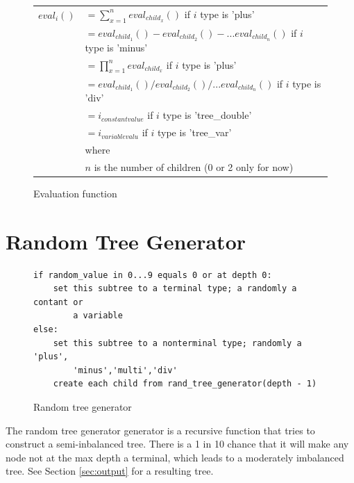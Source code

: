 \documentclass[12pt]{article}
\begin{document}
\begin{figure}[!h]
        \begin{center}
		\begin{tabular}{r l}
			$ eval_i() $	&	$ = \sum_{x=1}^{n} eval_{child_x}() $	if $i$ type is 'plus'\\
						&	$ = eval_{child_1}() - eval_{child_2}() - ... eval_{child_n}()$ if $i$ type is 'minus'\\
						&	$ = \prod_{x=1}^{n} eval_{child_x} $	if $i$ type is 'plus'\\
						&	$ = eval_{child_1}() / eval_{child_2}() / ... eval_{child_n}()$ if $i$ type is 'div'\\
						&	$ = i_{constant value} $ if $i$ type is 'tree\_double' \\
						&	$ = i_{variable valu} $ if $i$ type is 'tree\_var' \\
						& where \\
						& $ n $ is the number of children (0 or 2 only for now)
		\end{tabular}
               \caption{Evaluation function}
                \label{eval_func}
        \end{center}
\end{figure}

\pagebreak

\section{Random Tree Generator}
\begin{figure}[!h]
        \begin{center}
		\scriptsize
		\begin{lstlisting}
if random_value in 0...9 equals 0 or at depth 0:
	set this subtree to a terminal type; a randomly a contant or 
		a variable
else:
	set this subtree to a nonterminal type; randomly a 'plus', 
		'minus','multi','div'
	create each child from rand_tree_generator(depth - 1)
		\end{lstlisting}
		\normalsize
               \caption{Random tree generator}
                \label{rand_tree_gen}
        \end{center}
\end{figure}

The random tree generator generator is a recursive function that tries to construct a semi-inbalanced tree. There is a 1 in 10 chance that it will make any node not at the max depth a terminal, which leads to a moderately imbalanced tree. See Section \ref{sec:output} for a resulting tree.
\end{document}
